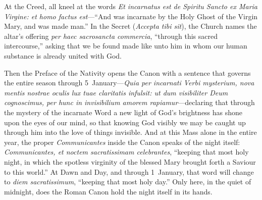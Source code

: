 At the Creed, all kneel at the words \textit{Et incarnatus est de Spiritu Sancto
ex Maria Virgine: et homo factus est}---``And was incarnate by the Holy Ghost of
the Virgin Mary, and was made man.'' In the Secret (\textit{Accepta tibi sit}), the Church names the altar's offering
\textit{per haec sacrosancta commercia}, ``through this sacred intercourse,''
asking that we be found made like unto him in whom our human substance is
already united with God.

Then the Preface of the Nativity opens the Canon with a sentence that governs
the entire season through 5~January---\textit{Quia per incarnati Verbi
mysterium, nova mentis nostrae oculis lux tuae claritatis infulsit: ut dum
visibiliter Deum cognoscimus, per hunc in invisibilium amorem rapiamur}---declaring
that through the mystery of the incarnate Word a new light of God's brightness
has shone upon the eyes of our mind, so that knowing God visibly we may be
caught up through him into the love of things invisible. And at this Mass alone
in the entire year, the proper \textit{Communicantes} inside the Canon speaks of
the night itself: \textit{Communicantes, et noctem sacratissimam celebrantes},
``keeping that most holy night, in which the spotless virginity of the blessed
Mary brought forth a Saviour to this world.'' At Dawn and Day, and through
1~January, that word will change to \textit{diem sacratissimum}, ``keeping that
most holy day.'' Only here, in the quiet of midnight, does the Roman Canon hold
the night itself in its hands.

